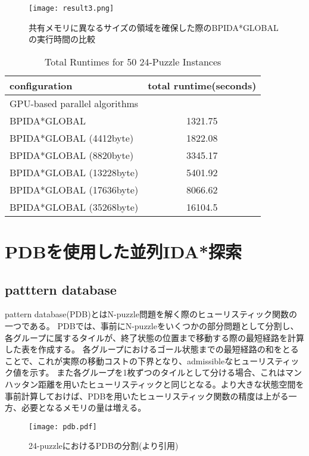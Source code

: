 \documentclass[a4paper,11pt,oneside,openany]{jsbook}
\begin{document}
\begin{figure}[hbtp]
\begin{center}
\texttt{[image: result3.png]}
\caption{共有メモリに異なるサイズの領域を確保した際のBPIDA*GLOBALの実行時間の比較}
\end{center}
\end{figure}

\begin{table}[hbtp]
\centering
\caption{Total Runtimes for 50 24-Puzzle Instances}
\label{my-label}
\begin{tabular}{|l|c|}
\hline
configuration & \multicolumn{1}{l|}{total runtime(seconds)} \\ \hline
\multicolumn{2}{|l|}{GPU-based parallel algorithms} \\ \hline
BPIDA*GLOBAL    & 1321.75  \\
BPIDA*GLOBAL (4412byte) & 1822.08  \\
BPIDA*GLOBAL (8820byte) &  3345.17 \\
BPIDA*GLOBAL (13228byte) & 5401.92 \\
BPIDA*GLOBAL (17636byte) & 8066.62 \\
BPIDA*GLOBAL (35268byte) & 16104.5 \\ \hline
\end{tabular}
\end{table}




\chapter{PDBを使用した並列IDA*探索}
\section{patttern database}
pattern database(PDB)\cite{CS98}とはN-puzzle問題を解く際のヒューリスティック関数の一つである。
PDBでは、事前にN-puzzleをいくつかの部分問題として分割し、各グループに属するタイルが、終了状態の位置まで移動する際の最短経路を計算した表を作成する。
各グループにおけるゴール状態までの最短経路の和をとることで、これが実際の移動コストの下界となり、admissibleなヒューリスティック値を示す。
また各グループを1枚ずつのタイルとして分ける場合、これはマンハッタン距離を用いたヒューリスティックと同じとなる。より大きな状態空間を事前計算しておけば、PDBを用いたヒューリスティック関数の精度は上がる一方、必要となるメモリの量は増える。

\begin{figure}[hbtp]
\begin{center}
\texttt{[image: pdb.pdf]}
\caption{24-puzzleにおけるPDBの分割(\cite{PDB}より引用)}
\end{center}
\end{figure}
\end{document}
